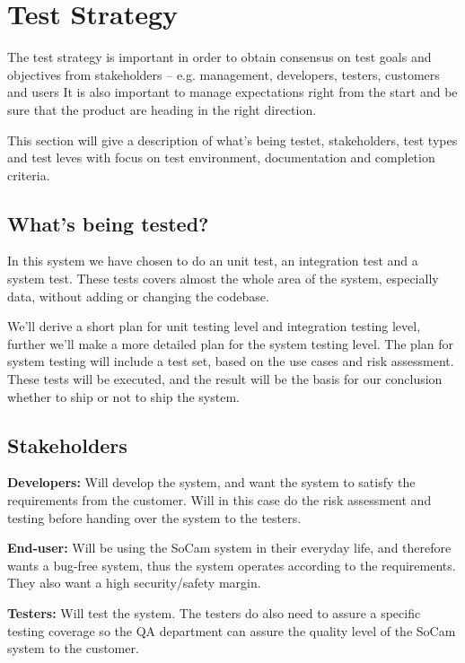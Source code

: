 \chapter{Test Strategy}


	The test strategy is important in order to obtain consensus on test goals and objectives from stakeholders – e.g. management, developers, testers, customers and users It is also important to manage expectations right from the start and be sure that the product are heading in the right direction.

	This section will give a description of what's being testet, stakeholders, test types and test leves with focus on test environment, documentation and completion criteria.

	\clearpage

	\section{What’s being tested?}

		In this system we have chosen to do  an unit test, 
		an integration test and a system test. 
		These tests covers almost the whole area of the system, especially data, without adding 
		or changing the codebase.

		We’ll derive a short plan for unit testing level and integration testing level, further 
		we’ll make a more detailed plan for the system testing level. The plan for system testing 
		will include a test set, based on the use cases and risk assessment. These tests will be 
		executed, and the result will be the basis for our conclusion whether to ship or not to 
		ship the system.

	\section{Stakeholders}

		{\bf Developers:} Will develop the system, and want the system to satisfy the requirements from the customer. Will in this case do the risk assessment and testing before handing over the system to the testers.

		{\bf End-user:} Will be using the SoCam system in their everyday life, and therefore wants a bug-free system, thus the system operates according to the requirements. They also want a high security/safety margin.

		{\bf Testers:} Will test the system. The testers do also need to assure a specific testing coverage so the QA department can assure the quality level of the SoCam system to the customer.   

